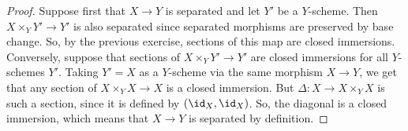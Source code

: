 \begin{proof}
	Suppose first that $X \to Y$ is separated and let $Y'$ be a $Y$-scheme. Then $X \times_Y Y' \to Y'$ is also separated since separated morphisms are preserved by base change. So, by the previous exercise, sections of this map are closed immersions. \\
	
	Conversely, suppose that sections of $X \times_Y Y' \to Y'$ are closed immersions for all $Y$-schemes $Y'$. Taking $Y' = X$ as a $Y$-scheme via the same morphism $X \to Y$, we get that any section of $X \times_Y X \to X$ is a closed immersion. But $\Delta : X \to X \times_Y X$ is such a section, since it is defined by $(\id_X,\id_X)$. So, the diagonal is a closed immersion, which means that $X \to Y$ is separated by definition.
\end{proof}
